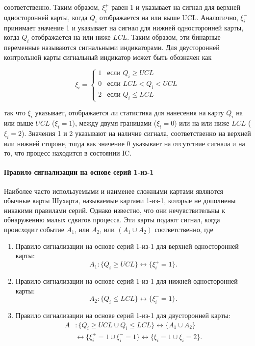 соответственно. Таким образом, \(\xi_{i}^{+}\) равен 1 и указывает на сигнал для верхней односторонней карты, когда \(Q_{i}\) отображается на или выше UCL. Аналогично, \(\xi_{i}^{-}\) принимает значение 1 и указывает на сигнал для нижней односторонней карты, когда \(Q_{i}\) отображается на или ниже \(LCL\). Таким образом, эти бинарные переменные называются сигнальными индикаторами. Для двусторонней контрольной карты сигнальный индикатор может быть обозначен как

\begin{equation}
	\xi_{i} = \begin{cases}
		1 & \text{если } Q_{i} \geq UCL \\
		0 & \text{если } LCL < Q_{i} < UCL \\
		2 & \text{если } Q_{i} \leq LCL
	\end{cases}
	\label{eq:3.19}
\end{equation}

так что \(\xi_{i}\) указывает, отображается ли статистика для нанесения на карту \(Q_{i}\) на или выше \(UCL\) (\(\xi_{i} = 1\)), между двумя границами (\(\xi_{i} = 0\)) или на или ниже \(LCL\) (\(\xi_{i} = 2\)). Значения 1 и 2 указывают на наличие сигнала, соответственно на верхней или нижней стороне, тогда как значение 0 указывает на отсутствие сигнала и на то, что процесс находится в состоянии IC.

\paragraph{Правило сигнализации на основе серий 1-из-1}
Наиболее часто используемыми и наименее сложными картами являются обычные карты Шухарта, называемые картами 1-из-1, которые не дополнены никакими правилами серий. Однако известно, что они нечувствительны к обнаружению малых сдвигов процесса. Эти карты подают сигнал, когда происходит событие \(A_{1}\), или \(A_{2}\), или \((A_{1} \cup A_{2})\) соответственно, где

\begin{enumerate}
	\item Правило сигнализации на основе серий 1-из-1 для верхней односторонней карты:
	\[
	A_{1}: \{Q_{i} \geq UCL\} \leftrightarrow \{\xi_{i}^{+} = 1\}.
	\]
	\item Правило сигнализации на основе серий 1-из-1 для нижней односторонней карты:
	\[
	A_{2}: \{Q_{i} \leq LCL\} \leftrightarrow \{\xi_{i}^{-} = 1\}.
	\]
	\item Правило сигнализации на основе серий 1-из-1 для двусторонней карты:
	\[
	\begin{aligned}
		A &: \{Q_{i} \geq UCL \cup Q_{i} \leq LCL\} \leftrightarrow \{A_{1} \cup A_{2}\} \\
		&\leftrightarrow \{\xi_{i}^{+} = 1 \cup \xi_{i}^{-} = 1\} \leftrightarrow \{\xi_{i} = 1 \cup \xi_{i} = 2\}.
	\end{aligned}
	\]
\end{enumerate}

